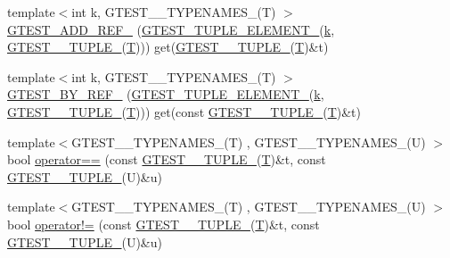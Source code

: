 \begin{DoxyCompactItemize}
\item 
{\footnotesize template$<$int k, G\+T\+E\+S\+T\+\_\+\_\+\+T\+Y\+P\+E\+N\+A\+M\+E\+S\+\_\+(\+T) $>$ }\\\hyperlink{namespacestd_1_1tr1_ad0769041710d18b917067576f84b0303}{G\+T\+E\+S\+T\+\_\+\+A\+D\+D\+\_\+\+R\+E\+F\+\_\+} (\hyperlink{gtest-tuple_8h_a1b7f133d8aa02e0b7afed7b66781eeb7}{G\+T\+E\+S\+T\+\_\+\+T\+U\+P\+L\+E\+\_\+\+E\+L\+E\+M\+E\+N\+T\+\_\+}(\hyperlink{jquery_8js_ab26645c014aa005ecedef329ecf58c99}{k}, \hyperlink{namespacestd_1_1tr1_aa636d3269bf1f368a7bc09ff158bc482}{G\+T\+E\+S\+T\+\_\+\_\+\+T\+U\+P\+L\+E\+\_\+}(\hyperlink{functions__7_8js_adf1f3edb9115acb0a1e04209b7a9937b}{T}))) get(\hyperlink{namespacestd_1_1tr1_aa636d3269bf1f368a7bc09ff158bc482}{G\+T\+E\+S\+T\+\_\+\_\+\+T\+U\+P\+L\+E\+\_\+}(\hyperlink{functions__7_8js_adf1f3edb9115acb0a1e04209b7a9937b}{T})\&t)
\item 
{\footnotesize template$<$int k, G\+T\+E\+S\+T\+\_\+\_\+\+T\+Y\+P\+E\+N\+A\+M\+E\+S\+\_\+(\+T) $>$ }\\\hyperlink{namespacestd_1_1tr1_a7c131d0c2462612a78012be16114f61d}{G\+T\+E\+S\+T\+\_\+\+B\+Y\+\_\+\+R\+E\+F\+\_\+} (\hyperlink{gtest-tuple_8h_a1b7f133d8aa02e0b7afed7b66781eeb7}{G\+T\+E\+S\+T\+\_\+\+T\+U\+P\+L\+E\+\_\+\+E\+L\+E\+M\+E\+N\+T\+\_\+}(\hyperlink{jquery_8js_ab26645c014aa005ecedef329ecf58c99}{k}, \hyperlink{namespacestd_1_1tr1_aa636d3269bf1f368a7bc09ff158bc482}{G\+T\+E\+S\+T\+\_\+\_\+\+T\+U\+P\+L\+E\+\_\+}(\hyperlink{functions__7_8js_adf1f3edb9115acb0a1e04209b7a9937b}{T}))) get(const \hyperlink{namespacestd_1_1tr1_aa636d3269bf1f368a7bc09ff158bc482}{G\+T\+E\+S\+T\+\_\+\_\+\+T\+U\+P\+L\+E\+\_\+}(\hyperlink{functions__7_8js_adf1f3edb9115acb0a1e04209b7a9937b}{T})\&t)
\item 
{\footnotesize template$<$G\+T\+E\+S\+T\+\_\+\_\+\+T\+Y\+P\+E\+N\+A\+M\+E\+S\+\_\+(\+T) , G\+T\+E\+S\+T\+\_\+\_\+\+T\+Y\+P\+E\+N\+A\+M\+E\+S\+\_\+(\+U) $>$ }\\bool \hyperlink{namespacestd_1_1tr1_af4516de784404381f9b14797694b6311}{operator==} (const \hyperlink{namespacestd_1_1tr1_aa636d3269bf1f368a7bc09ff158bc482}{G\+T\+E\+S\+T\+\_\+\_\+\+T\+U\+P\+L\+E\+\_\+}(\hyperlink{functions__7_8js_adf1f3edb9115acb0a1e04209b7a9937b}{T})\&t, const \hyperlink{namespacestd_1_1tr1_aa636d3269bf1f368a7bc09ff158bc482}{G\+T\+E\+S\+T\+\_\+\_\+\+T\+U\+P\+L\+E\+\_\+}(U)\&u)
\item 
{\footnotesize template$<$G\+T\+E\+S\+T\+\_\+\_\+\+T\+Y\+P\+E\+N\+A\+M\+E\+S\+\_\+(\+T) , G\+T\+E\+S\+T\+\_\+\_\+\+T\+Y\+P\+E\+N\+A\+M\+E\+S\+\_\+(\+U) $>$ }\\bool \hyperlink{namespacestd_1_1tr1_a058882c51de469b5e78d29076f864940}{operator!=} (const \hyperlink{namespacestd_1_1tr1_aa636d3269bf1f368a7bc09ff158bc482}{G\+T\+E\+S\+T\+\_\+\_\+\+T\+U\+P\+L\+E\+\_\+}(\hyperlink{functions__7_8js_adf1f3edb9115acb0a1e04209b7a9937b}{T})\&t, const \hyperlink{namespacestd_1_1tr1_aa636d3269bf1f368a7bc09ff158bc482}{G\+T\+E\+S\+T\+\_\+\_\+\+T\+U\+P\+L\+E\+\_\+}(U)\&u)
\end{DoxyCompactItemize}
